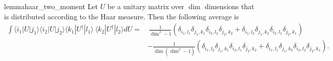 \documentclass{article}
\newcommand{\ket}[1]{|#1\rangle}
\newcommand{\bra}[1]{\langle #1|}
\newcommand{\parens}[1]{\left( #1 \right)}
\begin{document}
\begin{restatable}{lemma}{haar_two_moment} \label{lem:haar_two_moment}
    Let $U$ be a unitary matrix over $\dim$ dimensions that is distributed according to the Haar measure. Then the following average is
    \begin{align}
        \int \bra{i_1} U \ket{j_1} \bra{i_2} U \ket{j_2} \bra{k_1} U^\dagger \ket{l_1} ~ \bra{k_2} U^\dagger \ket{l_2} dU =& ~\frac{1}{\dim^2 - 1} \parens{\delta_{i_1, l_1} \delta_{j_1, k_1} \delta_{i_2, l_2} \delta_{j_2, k_2} + \delta_{i_1, l_2} \delta_{j_1, k_2} \delta_{i_2, l_1} \delta_{j_2, k_1}} \nonumber \\
        &- \frac{1}{\dim(\dim^2 - 1)} \parens{\delta_{i_1, l_2} \delta_{j_1, k_1} \delta_{i_2, l_1} \delta_{j_2, k_2} + \delta_{i_1, l_1} \delta_{j_1, k_2} \delta_{i_2, l_2} \delta_{j_2, k_1}}. \label{eq:haar_two_moment_integral}
    \end{align}
\end{restatable}
\end{document}
